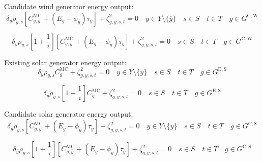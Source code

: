 \documentclass{article}
\newcommand{\sGeneratorsExistingSolar}{G^{\mathrm{E,S}}}
\newcommand{\sGeneratorsCandidateWind}{G^{\mathrm{C,W}}}
\newcommand{\sGeneratorsCandidateSolar}{G^{\mathrm{C,S}}}
\newcommand{\sYears}{Y}
\newcommand{\sScenarios}{S}
\newcommand{\sIntervals}{T}
\newcommand{\iGenerator}{g}
\newcommand{\iYear}{y}
\newcommand{\iYearTerminal}{\overline{\iYear}}
\newcommand{\iScenario}{s}
\newcommand{\iInterval}{t}
\newcommand{\cScenarioDuration}[1][\iYear,\iScenario]{\rho_{#1}}
\newcommand{\cMarginalCost}[1][\iGenerator,\iYear]{C^{\mathrm{MC}}_{#1}}
\newcommand{\cEmissionsIntensity}[1][\iGenerator]{E_{#1}}
\newcommand{\cInterestRate}{i}
\newcommand{\cDiscountRate}[1][\iYear]{\delta_{#1}}
\newcommand{\vBaseline}[1][\iYear]{\phi_{#1}}
\newcommand{\vPermitPrice}[1][\iYear]{\tau_{#1}}
\newcommand{\dGeneratorEnergyOutput}[1][\iGenerator,\iYear,\iScenario,\iInterval]{\zeta_{#1}^{2}}
\begin{document}
Candidate wind generator energy output:
\begin{equation}
\cDiscountRate\cScenarioDuration \left[\cMarginalCost + \left(\cEmissionsIntensity - \vBaseline\right)\vPermitPrice \right] + \dGeneratorEnergyOutput = 0 \quad \iYear \in \sYears \setminus \{\iYearTerminal\} \quad \iScenario \in \sScenarios \quad \iInterval \in \sIntervals \quad \iGenerator \in \sGeneratorsCandidateWind
\end{equation}

\begin{equation}
\cDiscountRate[\iYearTerminal] \cScenarioDuration[\iYearTerminal,\iScenario] \left[1 + \frac{1}{\cInterestRate}\right] \left[\cMarginalCost + \left(\cEmissionsIntensity - \vBaseline[\iYearTerminal]\right)\vPermitPrice[\iYearTerminal] \right] + \dGeneratorEnergyOutput[\iGenerator,\iYearTerminal,\iScenario,\iInterval] = 0 \quad \iScenario \in \sScenarios \quad \iInterval \in \sIntervals  \quad \iGenerator \in \sGeneratorsCandidateWind
\end{equation}

Existing solar generator energy output:
\begin{equation}
\cDiscountRate\cScenarioDuration \cMarginalCost[\iGenerator] + \dGeneratorEnergyOutput = 0 \quad \iYear \in \sYears \setminus \{\iYearTerminal\} \quad \iScenario \in \sScenarios \quad \iInterval \in \sIntervals \quad \iGenerator \in \sGeneratorsExistingSolar
\end{equation}

\begin{equation}
\cDiscountRate[\iYearTerminal] \cScenarioDuration[\iYearTerminal,\iScenario] \left[1 + \frac{1}{\cInterestRate}\right] \cMarginalCost[\iGenerator] + \dGeneratorEnergyOutput[\iGenerator,\iYearTerminal,\iScenario,\iInterval] = 0 \quad \iScenario \in \sScenarios \quad \iInterval \in \sIntervals \quad \iGenerator \in \sGeneratorsExistingSolar
\end{equation}

Candidate solar generator energy output:
\begin{equation}
\cDiscountRate\cScenarioDuration \left[\cMarginalCost + \left(\cEmissionsIntensity - \vBaseline\right)\vPermitPrice \right] + \dGeneratorEnergyOutput = 0 \quad \iYear \in \sYears \setminus \{\iYearTerminal\} \quad \iScenario \in \sScenarios \quad \iInterval \in \sIntervals \quad \iGenerator \in \sGeneratorsCandidateSolar
\end{equation}

\begin{equation}
\cDiscountRate[\iYearTerminal] \cScenarioDuration[\iYearTerminal,\iScenario] \left[1 + \frac{1}{\cInterestRate}\right] \left[\cMarginalCost[\iGenerator,\iYearTerminal] + \left(\cEmissionsIntensity - \vBaseline[\iYearTerminal]\right)\vPermitPrice[\iYearTerminal] \right] + \dGeneratorEnergyOutput[\iGenerator,\iYearTerminal,\iScenario,\iInterval] = 0 \quad \iScenario \in \sScenarios \quad \iInterval \in \sIntervals  \quad \iGenerator \in \sGeneratorsCandidateSolar
\end{equation}
\end{document}
